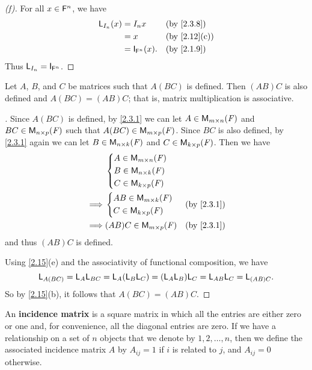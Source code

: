 \begin{proof}[(f)]
	For all \(x \in \mathsf{F}^n\), we have
	\begin{align*}
		\L_{I_n}(x) & = I_n x              &  & \by{2.3.8}   \\
		            & = x                  &  & \by{2.12}[c] \\
		            & = \IT_{\vs{F}^n}(x). &  & \by{2.1.9}
	\end{align*}
	Thus \(\L_{I_n} = \IT_{\vs{F}^n}\).
\end{proof}

\begin{thm}\label{2.16}
	Let \(A\), \(B\), and \(C\) be matrices such that \(A (BC)\) is defined.
	Then \((AB) C\) is also defined and \(A (BC) = (AB) C\);
	that is, matrix multiplication is associative.
\end{thm}

\begin{proof}[]
	Since \(A (BC)\) is defined, by \cref{2.3.1} we can let \(A \in \ms\) and \(BC \in \ms[n][p][\F]\) such that \(A (BC) \in \ms[m][p][\F]\).
	Since \(BC\) is also defined, by \cref{2.3.1} again we can let \(B \in \ms[n][k][\F]\) and \(C \in \ms[k][p][\F]\).
	Then we have
	\begin{align*}
		         & \begin{dcases}
			           A \in \ms           \\
			           B \in \ms[n][k][\F] \\
			           C \in \ms[k][p][\F]
		           \end{dcases}                      \\
		\implies & \begin{dcases}
			           AB \in \ms[m][k][\F] \\
			           C \in \ms[k][p][\F]
		           \end{dcases}  &  & \by{2.3.1}            \\
		\implies & (AB) C \in \ms[m][p][\F] &  & \by{2.3.1}
	\end{align*}
	and thus \((AB) C\) is defined.

	Using \cref{2.15}(e) and the associativity of functional composition, we have
	\[
		\mathsf{L}_{A (BC)} = \mathsf{L}_A \mathsf{L}_{BC} = \mathsf{L}_A (\mathsf{L}_B \mathsf{L}_C) = (\mathsf{L}_A \mathsf{L}_B) \mathsf{L}_C = \mathsf{L}_{AB} \mathsf{L}_C = \mathsf{L}_{(AB) C}.
	\]
	So by \cref{2.15}(b), it follows that \(A (BC) = (AB) C\).
\end{proof}

\begin{defn}\label{2.3.9}
	An \textbf{incidence matrix} is a square matrix in which all the entries are either zero or one and, for convenience, all the diagonal entries are zero.
	If we have a relationship on a set of \(n\) objects that we denote by \(1, 2, \dots, n\), then we define the associated incidence matrix \(A\) by \(A_{i j} = 1\) if \(i\) is related to \(j\), and \(A_{i j} = 0\) otherwise.
\end{defn}

